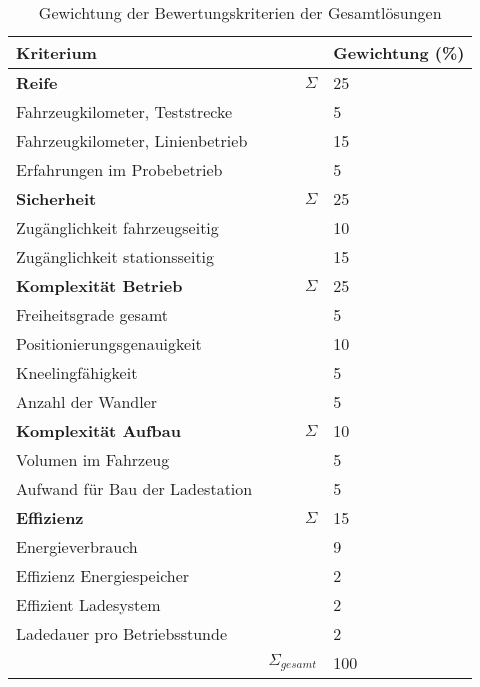 \begin{table}
	\centering
	\begin{tabularx}{\linewidth}{Xrl}
		\toprule
		Kriterium                        &                   & Gewichtung (\%) \\ \midrule
		\textbf{Reife}                   & $\Sigma$          & 25                    \\
		Fahrzeugkilometer, Teststrecke   &                   & 5                     \\
		Fahrzeugkilometer, Linienbetrieb &                   & 15                    \\
		Erfahrungen im Probebetrieb      &                   & 5                     \\ \midrule
		\textbf{Sicherheit}              & $\Sigma$          & 25                    \\
		Zugänglichkeit fahrzeugseitig    &                   & 10                    \\
		Zugänglichkeit stationsseitig    &                   & 15                    \\ \midrule
		\textbf{Komplexität Betrieb}     & $\Sigma$          & 25                    \\
		Freiheitsgrade gesamt            &                   & 5                     \\
		Positionierungsgenauigkeit       &                   & 10                    \\
		Kneelingfähigkeit                &                   & 5                     \\
		Anzahl der Wandler               &                   & 5                     \\ \midrule
		\textbf{Komplexität Aufbau}      & $\Sigma$          & 10                    \\
		Volumen im Fahrzeug              &                   & 5                     \\
		Aufwand für Bau der Ladestation  &                   & 5                     \\ \midrule
		\textbf{Effizienz}               & $\Sigma$          & 15                    \\
		Energieverbrauch                 &                   & 9                     \\
		Effizienz Energiespeicher        &                   & 2                     \\
		Effizient Ladesystem             &                   & 2                     \\
		Ladedauer pro Betriebsstunde     &                   & 2                     \\ \bottomrule
		                                 & $\Sigma_{gesamt}$ & 100
	\end{tabularx}
	\label{tab_bewertungskriterien}
	\caption{Gewichtung der Bewertungskriterien der Gesamtlösungen}
\end{table} 

